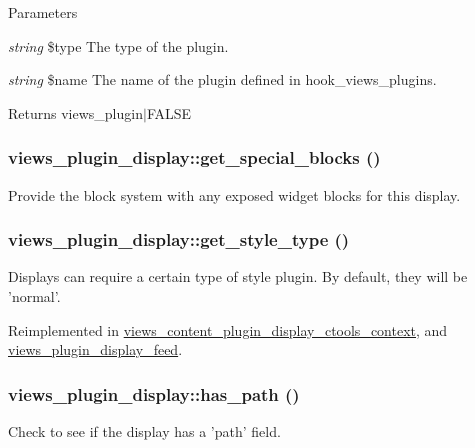 \begin{DoxyParams}{Parameters}
\item[{\em string}]\$type The type of the plugin. \item[{\em string}]\$name The name of the plugin defined in hook\_\-views\_\-plugins.\end{DoxyParams}
\begin{DoxyReturn}{Returns}
views\_\-plugin$|$FALSE 
\end{DoxyReturn}
\hypertarget{classviews__plugin__display_a1bdcb99f6d9a78a4b035c254af48cb99}{
\subsubsection[{get\_\-special\_\-blocks}]{\setlength{\rightskip}{0pt plus 5cm}views\_\-plugin\_\-display::get\_\-special\_\-blocks ()}}
\label{classviews__plugin__display_a1bdcb99f6d9a78a4b035c254af48cb99}
Provide the block system with any exposed widget blocks for this display. \hypertarget{classviews__plugin__display_a03f77cb37c3c3219d031c153aa59d20e}{
\subsubsection[{get\_\-style\_\-type}]{\setlength{\rightskip}{0pt plus 5cm}views\_\-plugin\_\-display::get\_\-style\_\-type ()}}
\label{classviews__plugin__display_a03f77cb37c3c3219d031c153aa59d20e}
Displays can require a certain type of style plugin. By default, they will be 'normal'. 

Reimplemented in \hyperlink{classviews__content__plugin__display__ctools__context_a885535a2ef690f2bf5ccefef707b7d3c}{views\_\-content\_\-plugin\_\-display\_\-ctools\_\-context}, and \hyperlink{classviews__plugin__display__feed_a9a7886409056fe5906021a70d2f41c14}{views\_\-plugin\_\-display\_\-feed}.\hypertarget{classviews__plugin__display_a08fe612e61fe35f549f0ec9a1fe8d953}{
\subsubsection[{has\_\-path}]{\setlength{\rightskip}{0pt plus 5cm}views\_\-plugin\_\-display::has\_\-path ()}}
\label{classviews__plugin__display_a08fe612e61fe35f549f0ec9a1fe8d953}
Check to see if the display has a 'path' field.

